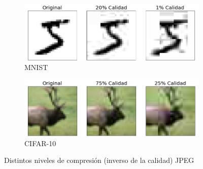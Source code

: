 \begin{figure}[h]
    \centering
    \begin{subfigure}[b]{0.48\textwidth}
        \centering
        \includegraphics[width=\textwidth]{images/mnist/jpeg_qual_mnist.png}
        \caption{MNIST}
        \label{jpeg_cal_mnist}
    \end{subfigure}
    \hfill
    \begin{subfigure}[b]{0.48\textwidth}
        \centering
        \includegraphics[width=\textwidth]{images/cifar-10/jpeg_qual_cifar.png}
        \caption{CIFAR-10}
        \label{jpeg_cal_cifar}
    \end{subfigure}
    \caption{Distintos niveles de compresión (inverso de la calidad) JPEG}
    \label{cal_JPEG}
\end{figure}